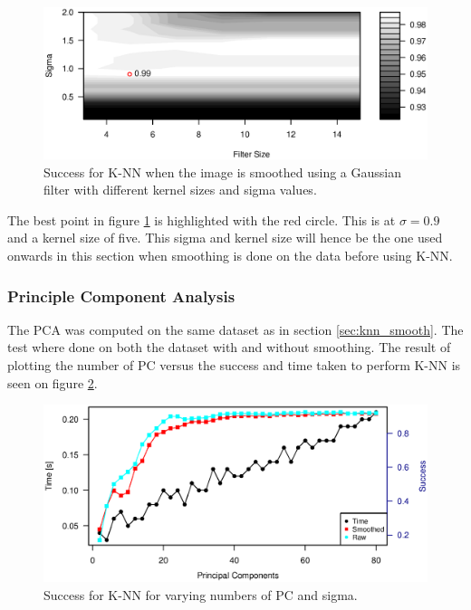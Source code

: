 \begin{figure}[H]
\centering
\includegraphics[width = 0.95 \textwidth]{graphics/knn_smooth_cont}
\caption[Success for K-NN with smoothing and PCA.]{Success for K-NN when the image is smoothed using a Gaussian filter with different kernel sizes and sigma values.}
\label{fig:cont_smooth_gaus_knn}
\end{figure}

The best point in figure \ref{fig:cont_smooth_gaus_knn} is highlighted with the red circle.
This is at $\sigma = 0.9$ and a kernel size of five.
This sigma and kernel size will hence be the one used onwards in this section when smoothing is done on the data before using K-NN.


\subsubsection{Principle Component Analysis}

The PCA was computed on the same dataset as in section \ref{sec:knn_smooth}.
The test where done on both the dataset with and without smoothing.
The result of plotting the number of PC versus the success and time taken to perform K-NN is seen on figure \ref{fig:plot_pca_knn}.

\begin{figure}[H]
\centering
\includegraphics[width = 0.95 \textwidth]{graphics/knn_pc}
\caption{Success for K-NN for varying numbers of PC and sigma.}
\label{fig:plot_pca_knn}
\end{figure}



